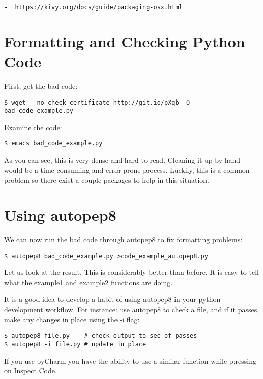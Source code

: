 \begin{verbatim}
-  https://kivy.org/docs/guide/packaging-osx.html
\end{verbatim}

\section{Formatting and Checking Python
Code}\label{formatting-and-checking-python-code}

First, get the bad code:

\begin{verbatim}
$ wget --no-check-certificate http://git.io/pXqb -O bad_code_example.py
\end{verbatim}

Examine the code:

\begin{verbatim}
$ emacs bad_code_example.py
\end{verbatim}

As you can see, this is very dense and hard to read. Cleaning it up by
hand would be a time-consuming and error-prone process. Luckily, this is
a common problem so there exist a couple packages to help in this
situation.

\section{Using autopep8}\label{using-autopep8}

We can now run the bad code through autopep8 to fix formatting problems:

\begin{verbatim}
$ autopep8 bad_code_example.py >code_example_autopep8.py
\end{verbatim}

Let us look at the result. This is considerably better than before. It
is easy to tell what the example1 and example2 functions are doing.

It is a good idea to develop a habit of using autopep8 in your
python-development workflow. For instance: use autopep8 to check a file,
and if it passes, make any changes in place using the -i flag:

\begin{verbatim}
$ autopep8 file.py    # check output to see of passes
$ autopep8 -i file.py # update in place
\end{verbatim}

If you use pyCharm you have the ability to use a similar function while
p;ressing on Inspect Code.

